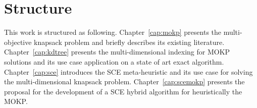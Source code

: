 \nocite{baroni2015shuffled}
\nocite{baroni2016shuffled}
\nocite{baroni2017}
\nocite{baroni2018}

\newpage
\section{Structure}
This work is structured as following.
Chapter~\ref{cap:mokp} presents the multi-objective knapsack problem
and briefly describes its existing literature.
Chapter~\ref{cap:kdtree} presents the multi-dimensional
indexing for MOKP solutions and its use case application
on a state of art exact algorithm.
Chapter~\ref{cap:sce} introduces the SCE 
meta-heuristic and its use case for solving
the multi-dimensional knapsack problem.
Chapter~\ref{cap:scemokp} presents the proposal for the development
of a SCE hybrid algorithm for heuristically the MOKP.
